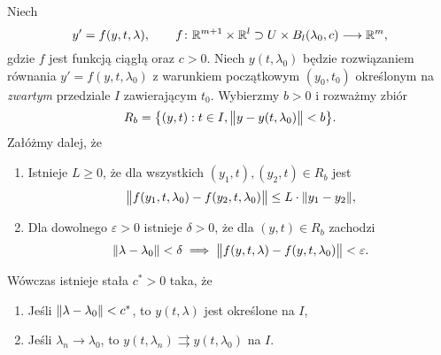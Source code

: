 
\begin{theorem}
  Niech
  \[
    y' = f(y,t,\lambda), \qquad
    f \colon \R^{m + 1} \times \R^l \supset U \times B_l(\lambda_0,c) \longrightarrow \R^m,
  \]
  gdzie $f$ jest funkcją ciągłą oraz $c > 0$. Niech $y(t,\lambda_0)$ będzie rozwiązaniem równania
  $y' = f(y,t,\lambda_0)$ z warunkiem początkowym $(y_0, t_0)$ określonym na \emph{zwartym}
  przedziale $I$ zawierającym $t_0$. Wybierzmy $b > 0$ i rozważmy zbiór 
  \[
    R_b = \big\{ (y,t) : t \in I, \norm[\big]{ y - y(t,\lambda_0) } < b \big\}.
  \]
  Załóżmy dalej, że
  \begin{enumerate}
    \item Istnieje $L \geq 0$, że dla wszystkich $(y_1,t),(y_2,t) \in R_b$ jest
    \[
      \norm[\big]{ f(y_1,t,\lambda_0) - f(y_2,t,\lambda_0) } \leq L \cdot \norm{y_1 - y_2},
    \]
    \item Dla dowolnego $\varepsilon > 0$ istnieje $\delta > 0$, że dla $(y,t) \in R_b$ zachodzi
    \[
      \norm{\lambda - \lambda_0} < \delta \implies \norm[\big]{ f(y,t,\lambda) - f(y,t,\lambda_0) } < \varepsilon.
    \]
  \end{enumerate}
  Wówczas istnieje stała $c^{\ast} > 0$ taka, że
  \begin{enumerate}
    \item Jeśli $\norm{\lambda - \lambda_0} < c^{\ast}$, to $y(t,\lambda)$ jest określone na $I$,
    \item Jeśli $\lambda_n \to \lambda_0$, to $y(t,\lambda_n) \rightrightarrows y(t,\lambda_0)$ na $I$.
  \end{enumerate}
\end{theorem}